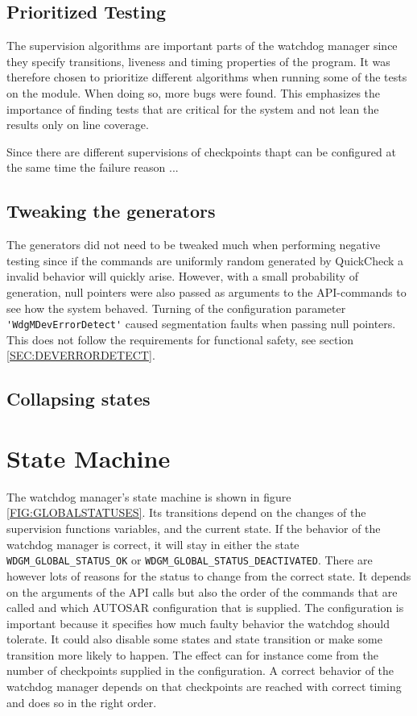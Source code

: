 \subsection{Prioritized Testing}
The supervision algorithms are important parts of the watchdog manager
since they specify transitions, liveness and timing properties of the
program. It was therefore chosen to prioritize different algorithms
when running some of the tests on the module. When doing so, more bugs
were found. This emphasizes the importance of finding tests that are
critical for the system and not lean the results only on line
coverage.

Since there are different supervisions of checkpoints thapt can be
configured at the same time the failure reason ...

\subsection{Tweaking the generators}
The generators did not need to be tweaked much when performing
negative testing since if the commands are uniformly random generated
by QuickCheck a invalid behavior will quickly arise. However, with a
small probability of generation, null pointers were also passed as
arguments to the API-commands to see how the system behaved. Turning
of the configuration parameter \lstinline!'WdgMDevErrorDetect'! caused
segmentation faults when passing null pointers. This does not follow
the requirements for functional safety, see section
\ref{SEC:DEVERRORDETECT}.

\subsection{Collapsing states}

\section{State Machine}
The watchdog manager's state machine is shown in figure
\ref{FIG:GLOBALSTATUSES}. Its transitions depend on the changes of the
supervision functions variables, and the current state. If the
behavior of the watchdog manager is correct, it will stay in either
the state \lstinline!WDGM_GLOBAL_STATUS_OK! or
\lstinline!WDGM_GLOBAL_STATUS_DEACTIVATED!. There are however lots of
reasons for the status to change from the correct state. It depends on
the arguments of the API calls but also the order of the commands that
are called and which AUTOSAR configuration that is supplied. The
configuration is important because it specifies how much faulty
behavior the watchdog should tolerate. It could also disable some
states and state transition or make some transition more likely to
happen. The effect can for instance come from the number of
checkpoints supplied in the configuration. A correct behavior of the
watchdog manager depends on that checkpoints are reached with correct
timing and does so in the right order.

